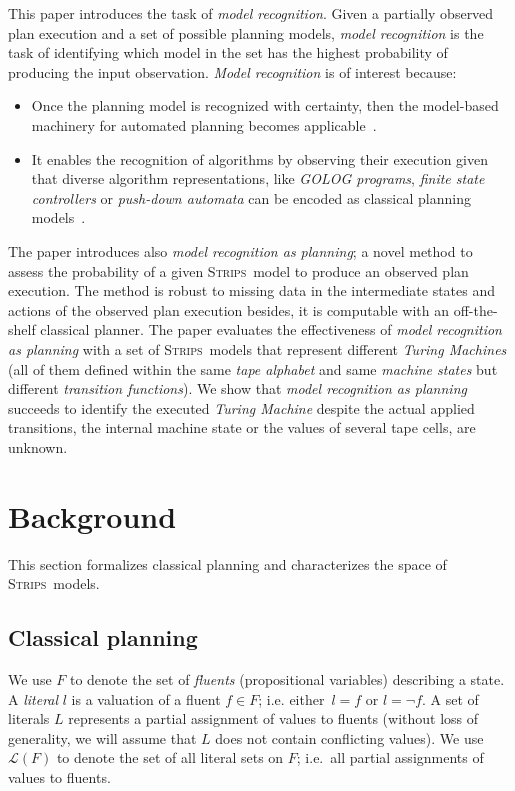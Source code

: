 \documentclass[letterpaper]{article} %
\newcommand{\strips}{\textsc{Strips}}     %
\begin{document}
This paper introduces the task of {\em model recognition}.  Given a partially observed plan execution and a set of possible planning models, {\em model recognition} is the task of identifying which model in the set has the highest probability of producing the input observation. {\em Model recognition} is of interest because:
\begin{itemize}
\item Once the planning model is recognized with certainty, then the model-based machinery for automated planning becomes applicable~\cite{ghallab2004automated}.
\item It enables the recognition of algorithms by observing their execution given that diverse algorithm representations, like {\em {\sc GOLOG} programs}, {\em finite state controllers} or {\em push-down automata} can be encoded as classical planning models~\cite{baier2007exploiting,Geffner:FSM:AAAI10,segovia2017generating}.
\end{itemize}

The paper introduces also {\em model recognition as planning}; a novel method to assess the probability of a given \strips\ model to produce an observed plan execution. The method is robust to missing data in the intermediate states and actions of the observed plan execution besides, it is computable with an off-the-shelf classical planner. The paper evaluates the effectiveness of {\em model recognition as planning} with a set of \strips\ models that represent different {\em Turing Machines} (all of them defined within the same {\em tape alphabet} and same {\em machine states} but different {\em transition functions}). We show that {\em model recognition as planning} succeeds to identify the executed {\em Turing Machine} despite the actual applied transitions, the internal machine state or the values of several tape cells, are unknown.


\section{Background}
\label{sec:background}
This section formalizes classical planning and characterizes the space of \strips\ models.

\subsection{Classical planning}
We use $F$ to denote the set of {\em fluents} (propositional variables) describing a state. A {\em literal} $l$ is a valuation of a fluent $f\in F$; i.e. either~$l=f$ or $l=\neg f$. A set of literals $L$ represents a partial assignment of values to fluents (without loss of generality, we will assume that $L$ does not contain conflicting values). We use $\mathcal{L}(F)$ to denote the set of all literal sets on $F$; i.e.~all partial assignments of values to fluents.
\end{document}
